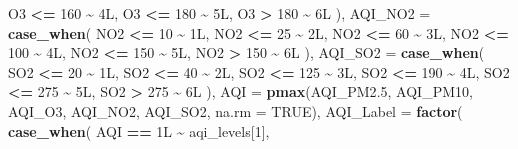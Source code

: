 \documentclass[
]{article}
\newenvironment{Shaded}{\begin{snugshade}}{\end{snugshade}}
\newcommand{\AttributeTok}[1]{\textcolor[rgb]{0.13,0.29,0.53}{#1}}
\newcommand{\ConstantTok}[1]{\textcolor[rgb]{0.56,0.35,0.01}{#1}}
\newcommand{\DataTypeTok}[1]{\textcolor[rgb]{0.13,0.29,0.53}{#1}}
\newcommand{\DecValTok}[1]{\textcolor[rgb]{0.00,0.00,0.81}{#1}}
\newcommand{\FloatTok}[1]{\textcolor[rgb]{0.00,0.00,0.81}{#1}}
\newcommand{\FunctionTok}[1]{\textcolor[rgb]{0.13,0.29,0.53}{\textbf{#1}}}
\newcommand{\NormalTok}[1]{#1}
\newcommand{\SpecialCharTok}[1]{\textcolor[rgb]{0.81,0.36,0.00}{\textbf{#1}}}
\begin{document}
\begin{Shaded}
\begin{Highlighting}[]
\NormalTok{        O3 }\SpecialCharTok{\textless{}=} \DecValTok{160} \SpecialCharTok{\textasciitilde{}} \DecValTok{4}\DataTypeTok{L}\NormalTok{, O3 }\SpecialCharTok{\textless{}=} \DecValTok{180} \SpecialCharTok{\textasciitilde{}} \DecValTok{5}\DataTypeTok{L}\NormalTok{, O3 }\SpecialCharTok{\textgreater{}}  \DecValTok{180} \SpecialCharTok{\textasciitilde{}} \DecValTok{6}\DataTypeTok{L}
\NormalTok{      ),}
      \AttributeTok{AQI\_NO2 =} \FunctionTok{case\_when}\NormalTok{(}
\NormalTok{        NO2 }\SpecialCharTok{\textless{}=}  \DecValTok{10} \SpecialCharTok{\textasciitilde{}} \DecValTok{1}\DataTypeTok{L}\NormalTok{, NO2 }\SpecialCharTok{\textless{}=}  \DecValTok{25} \SpecialCharTok{\textasciitilde{}} \DecValTok{2}\DataTypeTok{L}\NormalTok{, NO2 }\SpecialCharTok{\textless{}=}  \DecValTok{60} \SpecialCharTok{\textasciitilde{}} \DecValTok{3}\DataTypeTok{L}\NormalTok{,}
\NormalTok{        NO2 }\SpecialCharTok{\textless{}=} \DecValTok{100} \SpecialCharTok{\textasciitilde{}} \DecValTok{4}\DataTypeTok{L}\NormalTok{, NO2 }\SpecialCharTok{\textless{}=} \DecValTok{150} \SpecialCharTok{\textasciitilde{}} \DecValTok{5}\DataTypeTok{L}\NormalTok{, NO2 }\SpecialCharTok{\textgreater{}}  \DecValTok{150} \SpecialCharTok{\textasciitilde{}} \DecValTok{6}\DataTypeTok{L}
\NormalTok{      ),}
      \AttributeTok{AQI\_SO2 =} \FunctionTok{case\_when}\NormalTok{(}
\NormalTok{        SO2 }\SpecialCharTok{\textless{}=}  \DecValTok{20} \SpecialCharTok{\textasciitilde{}} \DecValTok{1}\DataTypeTok{L}\NormalTok{, SO2 }\SpecialCharTok{\textless{}=}  \DecValTok{40} \SpecialCharTok{\textasciitilde{}} \DecValTok{2}\DataTypeTok{L}\NormalTok{, SO2 }\SpecialCharTok{\textless{}=} \DecValTok{125} \SpecialCharTok{\textasciitilde{}} \DecValTok{3}\DataTypeTok{L}\NormalTok{,}
\NormalTok{        SO2 }\SpecialCharTok{\textless{}=} \DecValTok{190} \SpecialCharTok{\textasciitilde{}} \DecValTok{4}\DataTypeTok{L}\NormalTok{, SO2 }\SpecialCharTok{\textless{}=} \DecValTok{275} \SpecialCharTok{\textasciitilde{}} \DecValTok{5}\DataTypeTok{L}\NormalTok{, SO2 }\SpecialCharTok{\textgreater{}}  \DecValTok{275} \SpecialCharTok{\textasciitilde{}} \DecValTok{6}\DataTypeTok{L}
\NormalTok{      ),}
      \AttributeTok{AQI =} \FunctionTok{pmax}\NormalTok{(AQI\_PM2}\FloatTok{.5}\NormalTok{, AQI\_PM10, AQI\_O3, AQI\_NO2, AQI\_SO2, }\AttributeTok{na.rm =} \ConstantTok{TRUE}\NormalTok{),}
      \AttributeTok{AQI\_Label =} \FunctionTok{factor}\NormalTok{(}
        \FunctionTok{case\_when}\NormalTok{(}
\NormalTok{          AQI }\SpecialCharTok{==} \DecValTok{1}\DataTypeTok{L} \SpecialCharTok{\textasciitilde{}}\NormalTok{ aqi\_levels[}\DecValTok{1}\NormalTok{],}

\end{Highlighting}
\end{Shaded}
\end{document}
